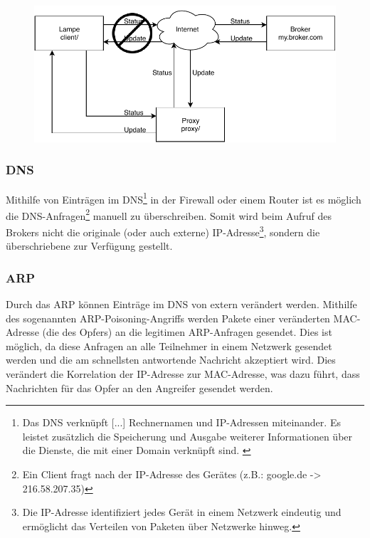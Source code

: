         \begin{figure}[h]%
            \centering
            \includegraphics[width=14cm]{tex/bilder/2_grundlagen/Szenario1_MitM.pdf}
            \label{fig:szenario-mitm}
        \end{figure}
        
        \subsubsection{DNS}
        Mithilfe von Einträgen im \ac{DNS}\footnote{\glqq Das DNS verknüpft [...] Rechnernamen und IP-Adressen miteinander. Es leistet zusätzlich die Speicherung und Ausgabe weiterer Informationen über die Dienste, die mit einer Domain verknüpft sind.\grqq{} \cite{denic_eg}} in der Firewall oder einem Router ist es möglich die \ac{DNS}-Anfragen\footnote{Ein Client fragt nach der \acs{IP}-Adresse des Gerätes (z.B.: google.de -> 216.58.207.35)} manuell zu überschreiben. Somit wird beim Aufruf des Brokers nicht die originale (oder auch externe) IP-Adresse\footnote{Die \acs{IP}-Adresse identifiziert jedes Gerät in einem Netzwerk eindeutig und ermöglicht das Verteilen von Paketen über Netzwerke hinweg.}, sondern die überschriebene zur Verfügung gestellt.
        \subsubsection{ARP}
        Durch das \ac{ARP} können Einträge im \ac{DNS} von extern verändert werden. Mithilfe des sogenannten \acs{ARP}-Poisoning-Angriffs werden Pakete einer veränderten \ac{MAC}-Adresse (die des Opfers) an die legitimen \ac{ARP}-Anfragen gesendet. Dies ist möglich, da diese Anfragen an alle Teilnehmer in einem Netzwerk gesendet werden und die am schnellsten antwortende Nachricht akzeptiert wird. Dies verändert die Korrelation der \acs{IP}-Adresse zur \acs{MAC}-Adresse, was dazu führt, dass Nachrichten für das Opfer an den Angreifer gesendet werden. \cite{4768661}
